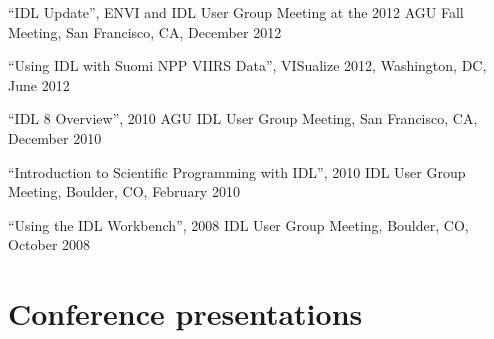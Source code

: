 \documentclass[letterpaper]{resume}
\begin{document}
\begin{enumerate}[{[}1{]}]
  \item ``IDL Update'', ENVI and IDL User Group Meeting at the 2012
    AGU Fall Meeting, San Francisco, CA, December 2012

  \item ``Using IDL with Suomi NPP VIIRS Data'', {VISualize} 2012,
    Washington, DC, June 2012

  \item ``IDL 8 Overview'', 2010 AGU IDL User Group Meeting, San
    Francisco, CA, December 2010

  \item ``Introduction to Scientific Programming with IDL'', 2010 IDL
    User Group Meeting, Boulder, CO, February 2010

  \item ``Using the IDL Workbench'', 2008 IDL User Group Meeting,
    Boulder, CO, October 2008

\end{enumerate}


\section{Conference presentations}
\vspace{0.5em}
\end{document}
